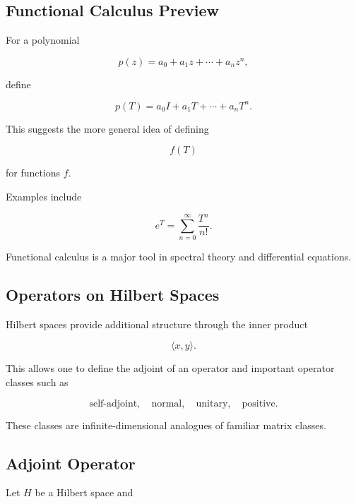 \subsection{Functional Calculus Preview}
\label{subsec:functional-calculus-preview}

For a polynomial

\[
p(z)
=
a_0+a_1z+\cdots+a_nz^n,
\]

define

\[
\boxed{
p(T)
=
a_0I+a_1T+\cdots+a_nT^n.
}
\]

This suggests the more general idea of defining

\[
\boxed{
f(T)
}
\]

for functions \(f\).

Examples include

\[
\boxed{
e^T
=
\sum_{n=0}^{\infty}
\frac{T^n}{n!}.
}
\]

Functional calculus is a major tool in spectral theory and differential
equations.

\subsection{Operators on Hilbert Spaces}
\label{subsec:operators-hilbert-spaces}

Hilbert spaces provide additional structure through the inner product

\[
\langle x,y\rangle.
\]

This allows one to define the adjoint of an operator and important
operator classes such as

\[
\boxed{
\text{self-adjoint},
\quad
\text{normal},
\quad
\text{unitary},
\quad
\text{positive}.
}
\]

These classes are infinite-dimensional analogues of familiar matrix
classes.

\subsection{Adjoint Operator}
\label{subsec:adjoint-operator}

Let \(H\) be a Hilbert space and

